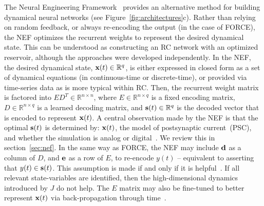 The Neural Engineering Framework~\citep[NEF;][]{eliasmith1999developing,eliasmith2003neural} provides an alternative method for building dynamical neural networks (see Figure~\ref{fig:architectures}c).
Rather than relying on random feedback, or always re-encoding the output (in the case of FORCE), the NEF optimizes the recurrent weights to represent the desired dynamical state.
This can be understood as constructing an RC network with an optimized reservoir, although the approaches were developed independently.
In the NEF, the desired dynamical state, $\mathbf{x}(t) \in \mathbb{R}^q$, is either expressed in closed form as a set of dynamical equations (in continuous-time or discrete-time), or provided via time-series data as is more typical within RC.
Then, the recurrent weight matrix is factored into $ED^T \in \mathbb{R}^{n \times n}$, where $E \in \mathbb{R}^{n \times q}$ is a fixed encoding matrix, $D \in \mathbb{R}^{n \times q}$ is a learned decoding matrix, and $\mathbf{s}(t) \in \mathbb{R}^q$ is the decoded vector that is encoded to represent $\mathbf{x}(t)$.
A central observation made by the NEF is that the optimal $\mathbf{s}(t)$ is determined by: $\mathbf{x}(t)$, the model of postsynaptic current~(PSC), and whether the simulation is analog or digital~\citep{voelker2017b}.
We review this in section~\ref{sec:nef}.
In the same way as FORCE, the NEF may include $\mathbf{d}$ as a column of $D$, and $\mathbf{e}$ as a row of $E$, to re-encode $y(t)$ -- equivalent to asserting that $y(t) \in \mathbf{s}(t)$.
This assumption is made if and only if it is helpful~\citep[i.e.,~to perform integration;][]{singh2004}.
If all relevant state-variables are identified, then the high-dimensional dynamics introduced by $J$ do not help.
The $E$ matrix may also be fine-tuned to better represent $\mathbf{x}(t)$ via back-propagation through time~\citep{rasmussen2018nengodl}.


